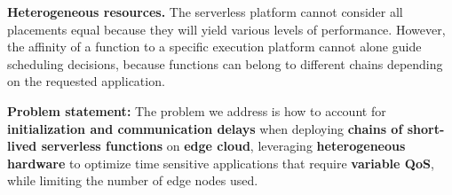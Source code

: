 \textbf{Heterogeneous resources.} The serverless platform cannot consider all placements equal because they will yield various levels of performance. However, the affinity of a function to a specific execution platform cannot alone guide scheduling decisions, because functions can belong to different chains depending on the requested application. %


\textbf{Problem statement:} The problem we address is how to account for \textbf{initialization and communication delays} when deploying \textbf{chains of short-lived serverless functions} on \textbf{edge cloud}, leveraging \textbf{heterogeneous hardware} to optimize time sensitive applications that require \textbf{variable QoS}, while limiting the number of edge nodes used.

